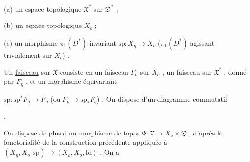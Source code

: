 (a) un espace topologique $\mathfrak{X}^*$ sur $\mathfrak{D}^*$ ;

(b) un espace topologique $X_o$ ;

(c) un morphisme $\pi_1(D^*)$-invariant $\mathrm{sp} : X_\eta \to X_o$ ($\pi_1(D^*)$ agissant trivialement sur $X_o$) .

Un \underline{faisceau} sur $\mathfrak{X}$ consiste en un faisceau $F_o$ sur $X_o$ , un faisceau sur $\mathfrak{X}^*$ , donné par $F_\eta$ , et un morphisme équivariant

$\mathrm{sp} : \mathrm{sp}^* F_o \longrightarrow F_\eta$ (ou $F_o \longrightarrow \mathrm{sp}_* F_\eta$) . On dispose d'un diagramme commutatif 



\begin{center}
\quad .
\end{center}
On dispose de plus d'un morphisme de topos $\Psi : \mathfrak{X} \to X_o \times \mathfrak{D}$ , d'après la fonctorialité de la construction précédente appliquée à $(X_\eta , X_o, \mathrm{sp}) \longrightarrow (X_o, X_o, \mathrm{Id})$ . On a

